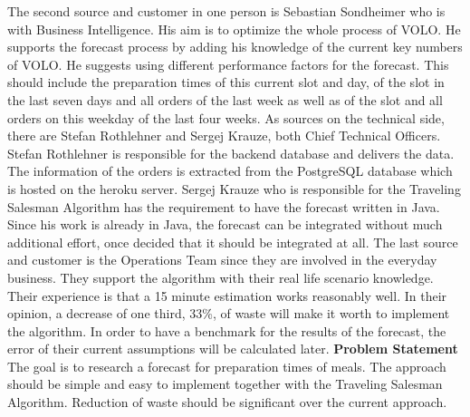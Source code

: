 The second source and customer in one person is Sebastian Sondheimer who is with Business Intelligence. His aim is to optimize the whole process of VOLO. He supports the forecast process by adding his knowledge of the current key numbers of VOLO. He suggests using different performance factors for the forecast. This should include the preparation times of this current slot and day, of the slot in the last seven days and all orders of the last week as well as of the slot and all orders on this weekday of the last four weeks.\newline
As sources on the technical side, there are Stefan Rothlehner and Sergej Krauze, both Chief Technical Officers. Stefan Rothlehner is responsible for the backend database and delivers the data. The information of the orders is extracted from the PostgreSQL database which is hosted on the heroku server. Sergej Krauze who is responsible for the Traveling Salesman Algorithm has the requirement to have the forecast written in Java. Since his work is already in Java, the forecast can be integrated without much additional effort, once decided that it should be integrated at all.\newline
The last source and customer is the Operations Team since they are involved in the everyday business. They support the algorithm with their real life scenario knowledge. Their experience is that a 15 minute estimation works reasonably well. In their opinion, a decrease of one third, 33\%, of waste will make it worth to implement the algorithm. In order to have a benchmark for the results of the forecast, the error of their current assumptions will be calculated later.
\newline\newline\textbf{Problem Statement}\newline
The goal is to research a forecast for preparation times of meals. The approach should be simple and easy to implement together with the Traveling Salesman Algorithm. Reduction of waste should be significant over the current approach.
